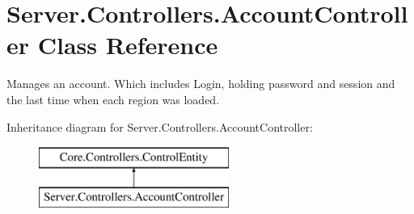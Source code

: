 \hypertarget{classServer_1_1Controllers_1_1AccountController}{\section{Server.\-Controllers.\-Account\-Controller Class Reference}
\label{classServer_1_1Controllers_1_1AccountController}
}


Manages an account. Which includes Login, holding password and session and the last time when each region was loaded.  


Inheritance diagram for Server.\-Controllers.\-Account\-Controller\-:\begin{figure}[H]
\begin{center}
\leavevmode
\includegraphics[height=2.000000cm]{classServer_1_1Controllers_1_1AccountController}
\end{center}
\end{figure}
